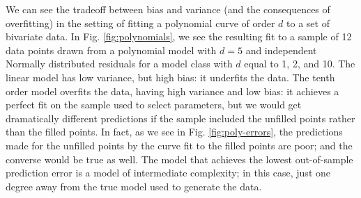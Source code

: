 We can see the tradeoff between bias and variance (and the
consequences of overfitting) in the setting of
fitting a polynomial curve of order $d$ to a set of bivariate data.
In Fig. \ref{fig:polynomials}, we see the resulting fit to a sample of
12 data points drawn from a polynomial model with $d = 5$ and
independent Normally distributed residuals for a model class with $d$
equal to 1, 2, and 10.  The linear model has low variance, but high
bias: it underfits the data.  The tenth order model overfits the data,
having high variance and low bias: it achieves a perfect fit on the
sample used to select parameters, but we would get dramatically
different predictions if the sample included the unfilled points
rather than the filled points.  In fact, as we see in
Fig. \ref{fig:poly-errors}, the predictions made for the unfilled
points by the curve fit to the filled points are poor; and the
converse would be true as well.  The model that achieves the lowest
out-of-sample prediction error is a model of intermediate complexity;
in this case, just one degree away from the true model used to
generate the data.

